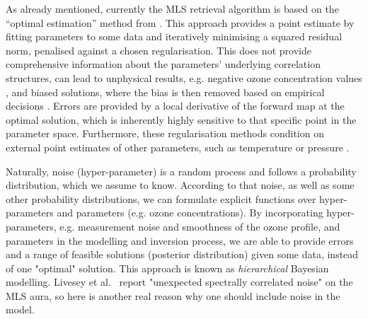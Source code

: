 As already mentioned, currently the MLS retrieval algorithm \cite{livesey2006retrieval} is based on the ``optimal estimation'' method from \cite{rodgers1976retrieval}.
This approach provides a point estimate by fitting parameters to some data and iteratively minimising a squared residual norm, penalised against a chosen regularisation.
This does not provide comprehensive information about the parameters' underlying correlation structures, can lead to unphysical results, e.g. negative ozone concentration values \cite{MLSdata}, and biased solutions, where the bias is then removed based on empirical decisions \cite{livesey2008ozonecarbonmono, Froidevaux2008snrozone}.
Errors are provided by a local derivative of the forward map at the optimal solution, which is inherently highly sensitive to that specific point in the parameter space.
Furthermore, these regularisation methods condition on external point estimates of other parameters, such as temperature or pressure \cite{livesey2006retrieval}.

Naturally, noise (hyper-parameter) is a random process and follows a probability distribution, which we assume to know.
According to that noise, as well as some other probability distributions, we can formulate explicit functions over hyper-parameters and parameters (e.g. ozone concentrations).
By incorporating hyper-parameters, e.g. measurement noise and smoothness of the ozone profile, and parameters in the modelling and inversion process, we are able to provide errors and a range of feasible solutions (posterior distribution) given some data, instead of one "optimal" solution.
This approach is known as \textit{hierarchical} Bayesian modelling.
Livesey et al.~\cite{livesey2006retrieval} report "unexpected spectrally correlated noise" on the MLS aura, so here is another real reason why one should include noise in the model.

